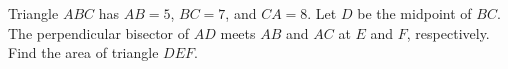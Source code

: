 Triangle $ABC$ has $AB=5$, $BC=7$, and $CA=8$. Let $D$ be the midpoint of $BC$. The perpendicular bisector of $AD$ meets $AB$ and $AC$ at $E$ and $F$, respectively. Find the area of triangle $DEF$.
